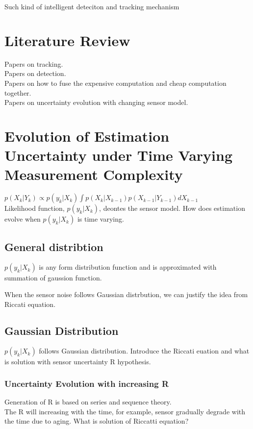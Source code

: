 \documentclass[12pt]{article}
\begin{document}
Such kind of intelligent deteciton and tracking mechanism 

\section{Literature Review}\label{literature_review}
\noindent Papers on tracking.\\
Papers on detection.\\
Papers on how to fuse the expensive computation and cheap computation together.\\
Papers on uncertainty evolution with changing sensor model.

\section{Evolution of Estimation Uncertainty under Time Varying Measurement Complexity}\label{estmation_uncertainty}

$p(X_{k}|Y_{k}) \propto p(y_{k}|X_{k}) \int p(X_{k}|X_{k-1})p(X_{k-1}|Y_{k-1}) dX_{k-1} $ \\

Likelihood function, $p(y_{k}|X_{k})$, deontes the sensor model.
How does estimation evolve when $p(y_{k}|X_{k})$ is time varying.

\subsection{General distribtion}
$p(y_{k}|X_{k})$ is any form distribution function and is approximated with summation of gaussion function. 

When the sensor noise follows Gaussian distrbution, we can justify the idea from Riccati equation.
\subsection{Gaussian Distribution}\label{Riccati_equation}
$p(y_{k}|X_{k})$ follows Gaussian distribution. Introduce the Riccati euation and what is solution with sensor uncertainty R hypothesis.

\subsubsection{Uncertainty Evolution with increasing R}
Generation of R is based on series and sequence theory.\\
The R will increasing with the time, for example, sensor gradually degrade with the time due to aging. What is solution of Riccatti equation?
\end{document}
